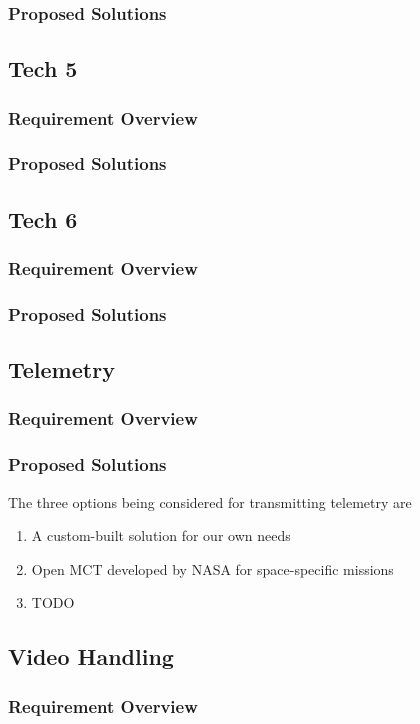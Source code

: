 \documentclass[letterpaper,10pt]{article}
\begin{document}
\subsubsection{Proposed Solutions}
\subsection{Tech 5}
\subsubsection{Requirement Overview}
\subsubsection{Proposed Solutions}
\subsection{Tech 6}
\subsubsection{Requirement Overview}
\subsubsection{Proposed Solutions}
\subsection{Telemetry}
\subsubsection{Requirement Overview}
\subsubsection{Proposed Solutions}
The three options being considered for transmitting telemetry are
\begin{enumerate}
\item{A custom-built solution for our own needs}
\item{Open MCT developed by NASA for space-specific missions}
\item{TODO} 
\end{enumerate}

\subsection{Video Handling}
\subsubsection{Requirement Overview}
\end{document}
